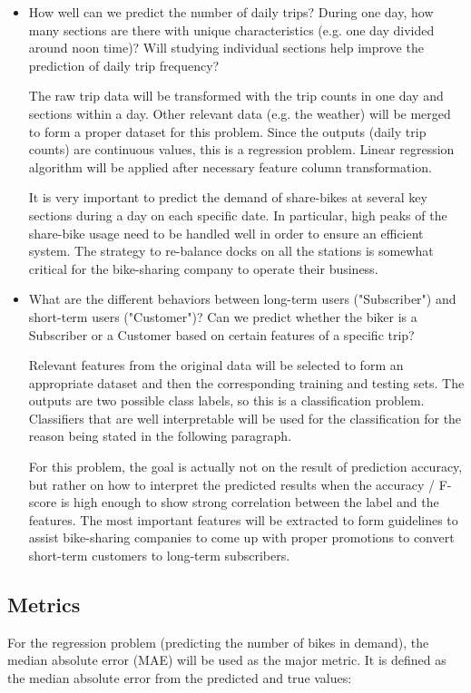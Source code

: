 \documentclass[a4paper]{article}
\begin{document}
		\begin{itemize}
			\item How well can we predict the number of daily trips? During one day, how many sections are there with unique characteristics (e.g. one day divided around noon time)? Will studying individual sections help improve the prediction of daily trip frequency? 
			
			The raw trip data will be transformed with the trip counts in one day and sections within a day. Other relevant data (e.g. the weather) will be merged to form a proper dataset for this problem. Since the outputs (daily trip counts) are continuous values, this is a regression problem. Linear regression algorithm will be applied after necessary feature column transformation.
		
			It is very important to predict the demand of share-bikes at several key sections during a day on each specific date. In particular, high peaks of the share-bike usage need to be handled well in order to ensure an efficient system. The strategy to re-balance docks on all the stations is somewhat critical for the bike-sharing company to operate their business.
			
			\item What are the different behaviors between long-term users ("Subscriber") and short-term users ("Customer")? Can we predict whether the biker is a Subscriber or a Customer based on certain features of a specific trip?
			
			Relevant features from the original data will be selected to form an appropriate dataset and then the corresponding training and testing sets. The outputs are two possible class labels, so this is a classification problem. Classifiers that are well interpretable will be used for the classification for the reason being stated in the following paragraph.
			
			For this problem, the goal is actually not on the result of prediction accuracy, but rather on how to interpret the predicted results when the accuracy / F-score is high enough to show strong correlation between the label and the features. The most important features will be extracted to form guidelines to assist bike-sharing companies to come up with proper promotions to convert short-term customers to long-term subscribers.
			
		\end{itemize}
		
		\subsection{Metrics}
		For the regression problem (predicting the number of bikes in demand), the median absolute error (MAE) will be used as the major metric. It is defined as the median absolute error from the predicted and true values:
		
\end{document}
